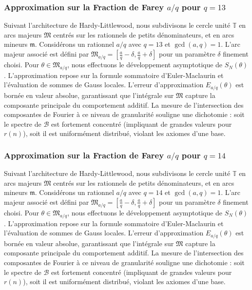 \documentclass[11pt,a4paper]{article}
\begin{document}
\subsubsection{Approximation sur la Fraction de Farey $a/q$ pour $q=13$}
Suivant l'architecture de Hardy-Littlewood, nous subdivisons le cercle unité $\mathbb{T}$ en arcs majeurs $\mathfrak{M}$ centrés sur les rationnels de petits dénominateurs, et en arcs mineurs $\mathfrak{m}$.
Considérons un rationnel $a/q$ avec $q = 13$ et $\gcd(a,q)=1$. L'arc majeur associé est défini par $\mathfrak{M}_{a/q} = [\frac{a}{q} - \delta, \frac{a}{q} + \delta]$ pour un paramètre $\delta$ finement choisi.
Pour $\theta \in \mathfrak{M}_{a/q}$, nous effectuons le développement asymptotique de $S_N(\theta)$.
L'approximation repose sur la formule sommatoire d'Euler-Maclaurin et l'évaluation de sommes de Gauss locales.
L'erreur d'approximation $E_{a/q}(\theta)$ est bornée en valeur absolue, garantissant que l'intégrale sur $\mathfrak{M}$ capture la composante principale du comportement additif.
La mesure de l'intersection des composantes de Fourier à ce niveau de granularité souligne une dichotomie : soit le spectre de $\mathcal{B}$ est fortement concentré (impliquant de grandes valeurs pour $r(n)$), soit il est uniformément distribué, violant les axiomes d'une base.
\subsubsection{Approximation sur la Fraction de Farey $a/q$ pour $q=14$}
Suivant l'architecture de Hardy-Littlewood, nous subdivisons le cercle unité $\mathbb{T}$ en arcs majeurs $\mathfrak{M}$ centrés sur les rationnels de petits dénominateurs, et en arcs mineurs $\mathfrak{m}$.
Considérons un rationnel $a/q$ avec $q = 14$ et $\gcd(a,q)=1$. L'arc majeur associé est défini par $\mathfrak{M}_{a/q} = [\frac{a}{q} - \delta, \frac{a}{q} + \delta]$ pour un paramètre $\delta$ finement choisi.
Pour $\theta \in \mathfrak{M}_{a/q}$, nous effectuons le développement asymptotique de $S_N(\theta)$.
L'approximation repose sur la formule sommatoire d'Euler-Maclaurin et l'évaluation de sommes de Gauss locales.
L'erreur d'approximation $E_{a/q}(\theta)$ est bornée en valeur absolue, garantissant que l'intégrale sur $\mathfrak{M}$ capture la composante principale du comportement additif.
La mesure de l'intersection des composantes de Fourier à ce niveau de granularité souligne une dichotomie : soit le spectre de $\mathcal{B}$ est fortement concentré (impliquant de grandes valeurs pour $r(n)$), soit il est uniformément distribué, violant les axiomes d'une base.
\end{document}
